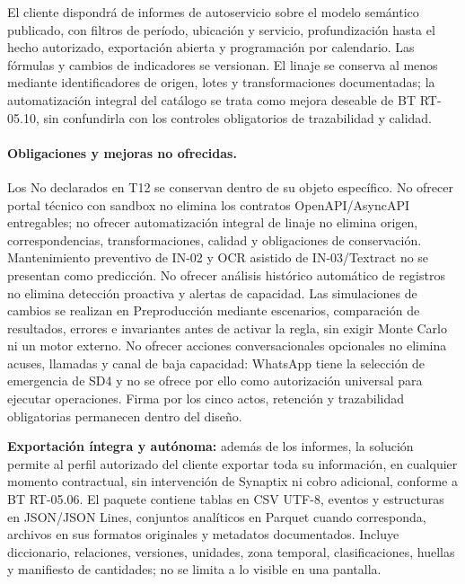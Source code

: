 



El cliente dispondrá de informes de autoservicio sobre el modelo semántico publicado, con filtros de período, ubicación y servicio, profundización hasta el hecho autorizado, exportación abierta y programación por calendario. Las fórmulas y cambios de indicadores se versionan. El linaje se conserva al menos mediante identificadores de origen, lotes y transformaciones documentadas; la automatización integral del catálogo se trata como mejora deseable de BT RT-05.10, sin confundirla con los controles obligatorios de trazabilidad y calidad.

\paragraph{Obligaciones y mejoras no ofrecidas.}
Los No declarados en T12 se conservan dentro de su objeto específico. No ofrecer portal técnico con sandbox no elimina los contratos OpenAPI/AsyncAPI entregables; no ofrecer automatización integral de linaje no elimina origen, correspondencias, transformaciones, calidad y obligaciones de conservación. Mantenimiento preventivo de IN-02 y OCR asistido de IN-03/Textract no se presentan como predicción. No ofrecer análisis histórico automático de registros no elimina detección proactiva y alertas de capacidad.
Las simulaciones de cambios se realizan en Preproducción mediante escenarios, comparación de resultados, errores e invariantes antes de activar la regla, sin exigir Monte Carlo ni un motor externo. No ofrecer acciones conversacionales opcionales no elimina acuses, llamadas y canal de baja capacidad: WhatsApp tiene la selección de emergencia de SD4 y no se ofrece por ello como autorización universal para ejecutar operaciones. Firma por los cinco actos, retención y trazabilidad obligatorias permanecen dentro del diseño.

\textbf{Exportación íntegra y autónoma:} además de los informes, la solución permite al perfil autorizado del cliente exportar toda su información, en cualquier momento contractual, sin intervención de Synaptix ni cobro adicional, conforme a BT RT-05.06. El paquete contiene tablas en CSV UTF-8, eventos y estructuras en JSON/JSON Lines, conjuntos analíticos en Parquet cuando corresponda, archivos en sus formatos originales y metadatos documentados. Incluye diccionario, relaciones, versiones, unidades, zona temporal, clasificaciones, huellas y manifiesto de cantidades; no se limita a lo visible en una pantalla.

